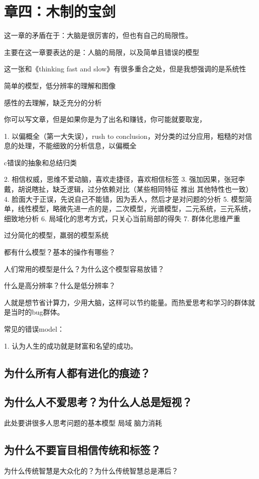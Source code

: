 \chapter{章四：木制的宝剑}
这一章的矛盾在于：大脑是很厉害的，但也有自己的局限性。

主要在这一章要表达的是：人脑的局限，以及简单且错误的模型

这一张和《thinking fast and slow》有很多重合之处，但是我想强调的是系统性

 简单的模型，低分辨率的理解和图像

 感性的去理解，缺乏充分的分析

 你可以写文章，但是如果你是为了出名和赚钱，你可能就要取宠，

1. 以偏概全（第一大失误），rush to conclusion，对分类的过分应用，粗糙的对信息的处理，不能细致的分析信息，以偏概全

c错误的抽象和总结归类

2. 相信权威，思维不爱动脑，喜欢走捷径，喜欢相信标签
3. 强加因果，张冠李戴，胡说瞎扯，缺乏逻辑，过分依赖对比（某些相同特征 推出 其他特性也一致）
4. 脸面大于正误，先说自己不能错，因为丢人，然后才是对问题的分析
5. 模型简单，线性模型，略微先进一点的是，二次模型，光谱模型，二元系统，三元系统，细致地分析
6. 局域化的思考方式，只关心当前局部的得失
7. 群体化思维严重

过分简化的模型，羸弱的模型系统

都有什么模型？基本的操作有哪些？

人们常用的模型是什么？为什么这个模型容易放错？

什么是高分辨率？什么是低分辨率？

人就是想节省计算力，少用大脑，这样可以节约能量。而热爱思考和学习的群体就是当时的bug群体。

常见的错误model：

1. 认为人生的成功就是财富和名望的成功。

\section{为什么所有人都有进化的痕迹？}
\section{为什么人不爱思考？为什么人总是短视？}
此处要讲很多人思考问题的基本模型 局域 脑力消耗

\section{为什么不要盲目相信传统和标签？}
为什么传统智慧是大众化的？为什么传统智慧总是滞后？
